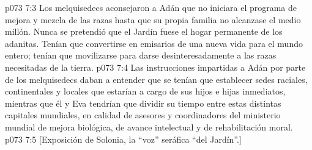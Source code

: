 \vs p073 7:3 \pc Los melquisedecs aconsejaron a Adán que no iniciara el programa de mejora y mezcla de las razas hasta que su propia familia no alcanzase el medio millón. Nunca se pretendió que el Jardín fuese el hogar permanente de los adanitas. Tenían que convertirse en emisarios de una nueva vida para el mundo entero; tenían que movilizarse para darse desinteresadamente a las razas necesitadas de la tierra.
\vs p073 7:4 Las instrucciones impartidas a Adán por parte de los melquisedecs daban a entender que se tenían que establecer sedes raciales, continentales y locales que estarían a cargo de sus hijos e hijas inmediatos, mientras que él y Eva tendrían que dividir su tiempo entre estas distintas capitales mundiales, en calidad de asesores y coordinadores del ministerio mundial de mejora biológica, de avance intelectual y de rehabilitación moral.
\vsetoff
\vs p073 7:5 [Exposición de Solonia, la “voz” seráfica “del Jardín”.]
